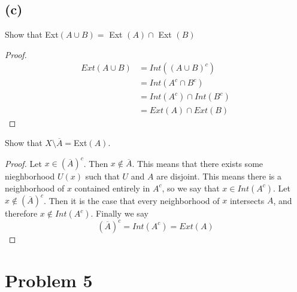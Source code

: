 \documentclass{article}
\theoremstyle{definition}
\begin{document}
    \subsection*{(c)}
        Show that Ext$(A \cup B) =$ Ext $(A) \cap $ Ext $(B)$
        \begin{proof}
            \begin{align*}
                Ext(A \cup B) & = Int((A \cup B)^c) \\
                &= Int(A^c \cap B^c) \\
                &= Int(A^c) \cap Int(B^c) \\
                &= Ext(A) \cap Ext(B)
            \end{align*}
        \end{proof}
        Show that $X \setminus \overline{A} = $Ext$(A)$.
        \begin{proof}
            Let $x \in (\overline{A})^c$. Then $x \notin \overline{A}$.
            This means that there exists some nieghborhood $U(x)$ such that $U$ and
            $A$ are disjoint. This means there is a neighborhood of $x$ contained entirely in $A^c$,
            so we say that $x \in Int(A^c)$. Let $x \notin (\overline{A})^c$. Then it is the case that
            every neighborhood of $x$ intersects $A$, and therefore $x \notin Int(A^c)$. Finally we say
            \[
                (\overline{A})^c = Int(A^c) = Ext(A)
            \]
        \end{proof}
\section*{Problem 5}
\end{document}
